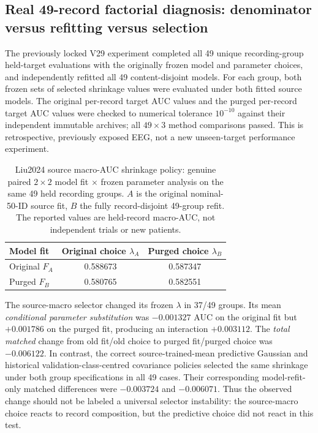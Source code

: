 \subsection{Real 49-record factorial diagnosis: denominator versus refitting versus selection}
\label{sec:v30-actual-crossed}
The previously locked V29 experiment completed all 49 unique
recording-group held-target evaluations with the originally
frozen model and parameter choices, and independently
refitted all 49 content-disjoint models.
For each group, both frozen sets of selected shrinkage
values were evaluated under both fitted source models.
The original per-record target AUC values and the purged
per-record target AUC values were checked to numerical
tolerance $10^{-10}$ against their independent immutable
archives; all $49\times3$ method comparisons passed.
This is retrospective, previously exposed EEG, not a
new unseen-target performance experiment.

\begin{table}[tb]
\centering
\small
\caption{Liu2024 source macro-AUC shrinkage policy: genuine
paired $2\times2$ model fit $\times$ frozen parameter analysis
on the same 49 held recording groups. $A$ is the original
nominal-50-ID source fit, $B$ the fully record-disjoint 49-group
refit. The reported values are held-record macro-AUC,
not independent trials or new patients.}
\label{tab:v30-crossed}
\begin{tabular}{lcc}
\toprule
Model fit & Original choice $\lambda_A$ & Purged choice $\lambda_B$\\
\midrule
Original $F_A$ & 0.588673 & 0.587347\\
Purged $F_B$ & 0.580765 & 0.582551\\
\bottomrule
\end{tabular}
\end{table}

The source-macro selector changed its frozen $\lambda$
in 37/49 groups. Its mean \emph{conditional parameter
substitution} was $-0.001327$ AUC on the original
fit but $+0.001786$ on the purged fit, producing
an interaction $+0.003112$. The \emph{total matched}
change from old fit/old choice to purged fit/purged
choice was $-0.006122$. In contrast, the correct
source-trained-mean predictive Gaussian and historical
validation-class-centred covariance policies selected
the same shrinkage under both group specifications
in all 49 cases. Their corresponding model-refit-only
matched differences were $-0.003724$ and $-0.006071$.
Thus the observed change should not be labeled a
universal selector instability: the source-macro
choice reacts to record composition, but the
predictive choice did not react in this test.

